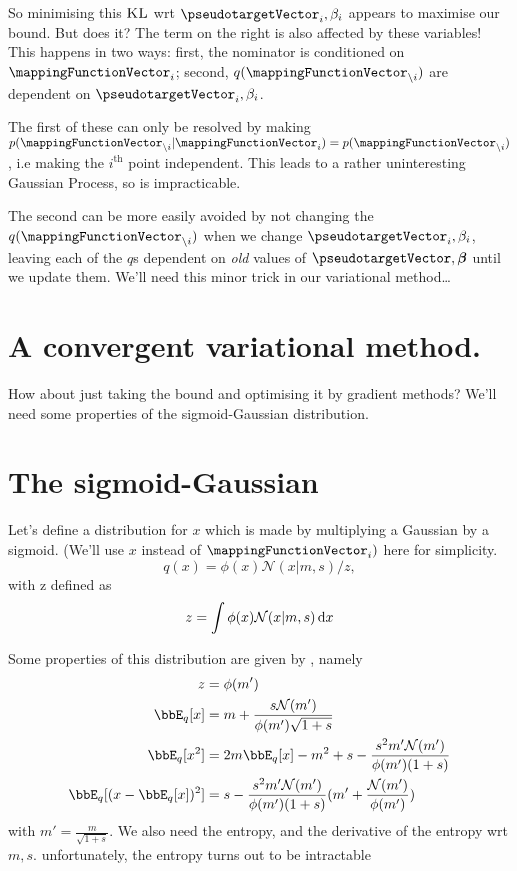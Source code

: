 \documentclass[times]{article} %
\newcommand{\noti}{{\backslash i}}
\renewcommand{\d}{\,\text d}
\begin{document}
So minimising this $\textsc{KL}$  wrt $\pseudotargetVector_i, \beta_i$ appears to maximise our bound. But does it? The term on the right is also affected by these variables! This happens in two ways: first, the nominator is conditioned on $\mappingFunctionVector_i$; second, $q(\mappingFunctionVector_\noti)$ are dependent on $\pseudotargetVector_i, \beta_i$. 

The first of these can only be resolved by making $p(\mappingFunctionVector_\noti|\mappingFunctionVector_i) = p(\mappingFunctionVector_\noti)$, i.e making the $i^\text{th}$ point independent. This leads to a rather uninteresting Gaussian Process, so is impracticable.  

The second can be more easily avoided by not changing the $q(\mappingFunctionVector_\noti)$ when we change $\pseudotargetVector_i, \beta_i$, leaving each of the $q$s dependent on {\em old} values of $\pseudotargetVector, \boldsymbol \beta$ until we update them. We'll need this minor trick in our variational method\ldots

\section{A convergent variational method. }
How about just taking the bound and optimising it by gradient methods? We'll need some properties of the sigmoid-Gaussian distribution.

\section{The sigmoid-Gaussian}
Let's define a distribution for $x$ which is made by multiplying a Gaussian by a sigmoid. (We'll use $x$ instead of $\mappingFunctionVector_i)$ here for simplicity. 
$$q(x) = \phi(x)\mathcal N(x | m, s)/z,$$
with z defined as 
$$z = \int \phi(x)\mathcal N(x | m, s) \d x$$

Some properties of this distribution are given by \cite{rasmussen2006gaussian}, namely
\begin{equation*}
	\begin{split}
		z &= \phi(m')\\
		\bbE_q[x] &= m + \frac{s \mathcal N(m')}{\phi(m')\sqrt{1+s}}\\
		\bbE_q[x^2] &= 2m\bbE_q[x] - m^2 + s - \frac{s^2 m' \mathcal N(m')}{\phi(m')(1+s)}\\
		\bbE_q[(x-\bbE_q[x])^2] &= s - \frac{s^2 m' \mathcal N(m')}{\phi(m')(1+s)}(m' + \frac{\mathcal N(m')}{\phi(m')})
	\end{split}
\end{equation*}
with $m' = \frac{m}{\sqrt{1+s}}$. We also need the entropy, and the derivative of the entropy wrt $m,s$. unfortunately, the entropy turns out to be intractable
\end{document}

